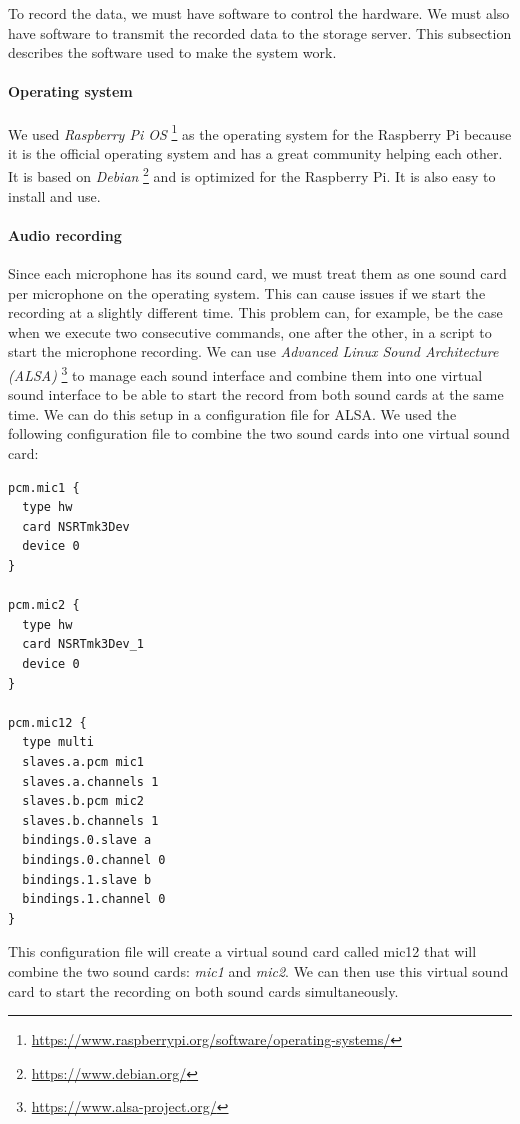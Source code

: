 To record the data, we must have software to control the hardware. We must also have software to transmit the recorded data to the storage server. This subsection describes the software used to make the system work.

\paragraph{Operating system}

We used \textit{Raspberry Pi OS} \footnote{\url{https://www.raspberrypi.org/software/operating-systems/}} as the operating system for the Raspberry Pi because it is the official operating system and has a great community helping each other. It is based on \textit{Debian} \footnote{\url{https://www.debian.org/}} and is optimized for the Raspberry Pi. It is also easy to install and use.

\paragraph{Audio recording}

Since each microphone has its sound card, we must treat them as one sound card per microphone on the operating system. This can cause issues if we start the recording at a slightly different time. This problem can, for example, be the case when we execute two consecutive commands, one after the other, in a script to start the microphone recording. We can use \textit{Advanced Linux Sound Architecture (ALSA)} \footnote{\url{https://www.alsa-project.org/}} to manage each sound interface and combine them into one virtual sound interface to be able to start the record from both sound cards at the same time. We can do this setup in a configuration file for ALSA. We used the following configuration file to combine the two sound cards into one virtual sound card:

\begin{lstlisting}
pcm.mic1 {
  type hw
  card NSRTmk3Dev
  device 0
}

pcm.mic2 {
  type hw
  card NSRTmk3Dev_1
  device 0
}

pcm.mic12 {
  type multi
  slaves.a.pcm mic1
  slaves.a.channels 1
  slaves.b.pcm mic2
  slaves.b.channels 1
  bindings.0.slave a
  bindings.0.channel 0
  bindings.1.slave b
  bindings.1.channel 0
}
\end{lstlisting}

This configuration file will create a virtual sound card called mic12 that will combine the two sound cards: \textit{mic1} and \textit{mic2}. We can then use this virtual sound card to start the recording on both sound cards simultaneously.

